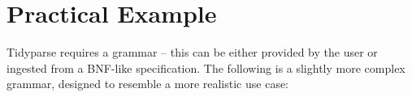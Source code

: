 \documentclass[sigplan,review,anonymous,acmsmall]{acmart}\settopmatter{printfolios=false,printccs=false,printacmref=false}
\begin{document}
%
%
%


\section{Practical Example}

Tidyparse requires a grammar -- this can be either provided by the user or ingested from a BNF-like specification. The following is a slightly more complex grammar, designed to resemble a more realistic use case:
\end{document}
